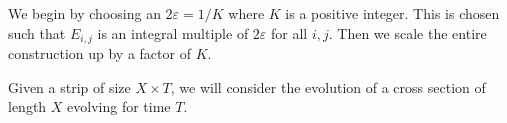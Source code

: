 We begin by choosing an $2\varepsilon=1/K$ where $K$ is a positive integer.
This is chosen such that $E_{i,j}$ is an integral multiple of $2\varepsilon$ for all $i,j$.
Then we scale the entire construction up by a factor of $K$.

Given a strip of size $X\times T$, we will consider the evolution of a cross section of length $X$ evolving for time $T$.






